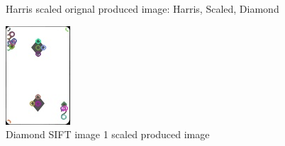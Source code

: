 \documentclass[conference]{IEEEtran}
\begin{document}
\begin{figure}[!htb]
\begin{minipage}[b]{0.2\textwidth}
    \caption{Harris scaled orignal produced image: Harris, Scaled, Diamond}
    \label{Harris scaled orignal produced image}
  \end{minipage}
  \hfill
  \begin{minipage}[b]{0.2\textwidth}
    \includegraphics[width=\textwidth]{../programme/results/Task_1/scaled_experiements/SIFT/diamond/image_1.jpg}
    \caption{Diamond SIFT image 1 scaled produced image}
    \label{Diamond SIFT image 1 scaled produced image}
  \end{minipage}
  \hfill
  \begin{minipage}[b]{0.2\textwidth}

\end{minipage}
\end{figure}
\end{document}
